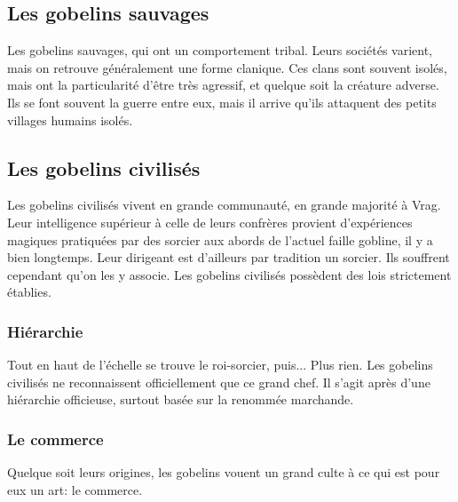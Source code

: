\subsection{Les gobelins sauvages}
Les gobelins sauvages, qui ont un comportement tribal. Leurs sociétés varient, mais on retrouve généralement une forme clanique. Ces clans sont souvent isolés, mais ont la particularité d'être très agressif, et quelque soit la créature adverse. Ils se font souvent la guerre entre eux, mais il arrive qu'ils attaquent des petits villages humains isolés.
\subsection{Les gobelins civilisés}
Les gobelins civilisés vivent en grande communauté, en grande majorité à Vrag. Leur intelligence supérieur à celle de leurs confrères provient d'expériences magiques pratiquées par des sorcier aux abords de l'actuel faille gobline, il y a bien longtemps. Leur dirigeant est d'ailleurs par tradition un sorcier.
Ils souffrent cependant qu’on les y associe. Les gobelins civilisés possèdent des lois strictement établies.
\subsubsection{Hiérarchie}
Tout en haut de l'échelle se trouve le roi-sorcier, puis... Plus rien. Les gobelins civilisés ne reconnaissent officiellement que ce grand chef. Il s'agit après d'une hiérarchie officieuse, surtout basée sur la renommée marchande.
\subsubsection{Le commerce}
Quelque soit leurs origines, les gobelins vouent un grand culte à ce qui est pour eux un art: le commerce.